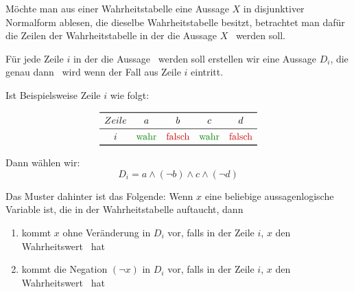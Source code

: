 \documentclass[../../main.tex]{subfiles}
\begin{document}


    Möchte man aus einer Wahrheitstabelle eine Aussage $X$ in disjunktiver Normalform 
    ablesen, die dieselbe Wahrheitstabelle besitzt,
    betrachtet man dafür die Zeilen der Wahrheitstabelle in der die 
    Aussage $X$ \wahr\ werden soll.

    Für jede Zeile $i$ in der die Aussage \wahr\ werden soll 
    erstellen wir eine Aussage
    $D_i$, die genau dann \wahr\  wird wenn der Fall  
    aus Zeile $i$ eintritt. 
    
    Ist Beispielsweise Zeile $i$ wie folgt:

    \[\begin{array}{ccccc}\toprule
         Zeile & a & b & c & d\\\midrule
         i &\wahr & \falsch & \wahr & \falsch \\ 
        \bottomrule
    \end{array}\]

    Dann wählen wir:
    \[D_i = a \land (\lnot b) \land c \land (\lnot d)\]

    Das Muster dahinter ist das Folgende:
    Wenn $x$ eine beliebige aussagenlogische Variable ist, 
    die in der Wahrheitstabelle auftaucht, dann
    \begin{enumerate}
        \item kommt $x$ ohne Veränderung in $D_i$ vor, falls in der Zeile $i$, $x$ den Wahrheitswert \wahr\ hat 
        \item kommt die Negation $(\lnot x)$ in $D_i$ vor, falls in der Zeile $i$, $x$ den Wahrheitswert \falsch\ hat
    \end{enumerate}
\end{document}
